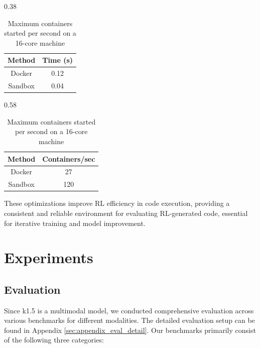 \documentclass{article}
\begin{document}
\begin{table}[h]
    \centering
    \begin{subtable}[t]{0.38\textwidth}
        \centering
        \vspace{-8pt} 
        \begin{tabular}{|c|c|}
            \hline
            \textbf{Method} & \textbf{Time (s)} \\
            \hline
            Docker & 0.12 \\
            Sandbox & 0.04 \\
            \hline
        \end{tabular}
        \caption{Container startup times}
        \vspace{-12pt}
        \label{tab:startup_times}
    \end{subtable}\hfill
    \begin{subtable}[t]{0.58\textwidth}
        \centering
        \vspace{-8pt}
        \begin{tabular}{|c|c|}
            \hline
            \textbf{Method} & \textbf{Containers/sec} \\
            \hline
            Docker & 27 \\
            Sandbox & 120 \\
            \hline
        \end{tabular}
        \caption{Maximum containers started per second on a 16-core machine}
        \vspace{-12pt}
        \label{tab:containers_per_second}
    \end{subtable}
\end{table}

These optimizations improve RL efficiency in code execution, providing a consistent and reliable environment for evaluating RL-generated code, essential for iterative training and model improvement.

\section{Experiments}

\subsection{Evaluation}

Since k1.5 is a multimodal model, we conducted comprehensive evaluation across various benchmarks for different modalities. The detailed evaluation setup can be found in Appendix \ref{sec:appendix_eval_detail}. Our benchmarks primarily consist of the following three categories:
\end{document}
